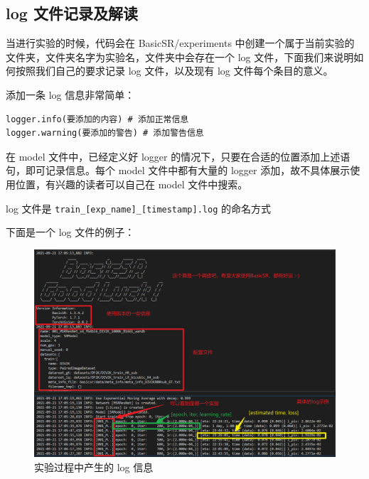 \documentclass[../main.tex]{subfiles}
\begin{document}
\subsection{log 文件记录及解读}

当进行实验的时候，代码会在 BasicSR/experiments 中创建一个属于当前实验的文件夹，文件夹名字为实验名，文件夹中会存在一个 log 文件，下面我们来说明如何按照我们自己的要求记录 log 文件，以及现有 log 文件每个条目的意义。

\begin{hl} %

    添加一条 log 信息非常简单：

    \begin{verbatim}
logger.info(要添加的内容) # 添加正常信息
logger.warning(要添加的警告) # 添加警告信息
\end{verbatim}
\end{hl}

在 model 文件中，已经定义好 logger 的情况下，只要在合适的位置添加上述语句，即可记录信息。每个 model 文件中都有大量的 logger 添加，故不具体展示使用位置，有兴趣的读者可以自己在 model 文件中搜索。

log 文件是 \texttt{train\_[exp\_name]\_[timestamp].log} 的命名方式

下面是一个 log 文件的例子：

\begin{figure}[H]
    \begin{center}
        \includegraphics[width=0.7\linewidth]{figures/getting_start_6.png}
        \caption{实验过程中产生的 log 信息}
        \label{fig:getting_start_6}
    \end{center}
    \vspace{-0.5cm}
\end{figure}
\end{document}

